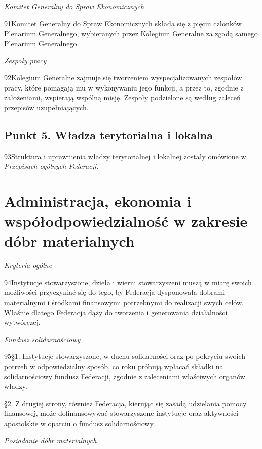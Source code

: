 ﻿\documentclass{book}
\newcommand{\lett}[1]{\lettrine[findent=6pt]{#1}}
\newcommand{\ssec}[1]{\vspace{1em}\textit{#1}\vspace{.5em}\nopagebreak}
\begin{document}
\ssec{Komitet Generalny do Spraw Ekonomicznych}


\lett{91} Komitet Generalny do Spraw Ekonomicznych składa się z pięciu członków Plenarium Generalnego, wybieranych przez Kolegium Generalne za zgodą samego Plenarium Generalnego.
 
\ssec{Zespoły pracy}


\lett{92} Kolegium Generalne zajmuje się tworzeniem wyspecjalizowanych zespołów pracy, które pomagają mu w wykonywaniu jego funkcji, a przez to, zgodnie z założeniami, wspierają wspólną misję. Zespoły podzielone są według zaleceń przepisów uzupełniających.
 


\section{Punkt 5. Władza terytorialna i lokalna}


\lett{93} Struktura i uprawnienia władzy terytorialnej i lokalnej zostały omówione w {\em Przepisach ogólnych Federacji}.
 


\chapter{Administracja, ekonomia i współodpowiedzialność w zakresie dóbr materialnych}


\ssec{Kryteria ogólne}


\lett{94} Instytucje stowarzyszone, dzieła i wierni stowarzyszeni muszą w miarę swoich możliwości przyczyniać się do tego, by Federacja dysponowała dobrami materialnymi i środkami finansowymi potrzebnymi do realizacji swych celów. Właśnie dlatego Federacja dąży do tworzenia i generowania działalności wytwórczej.
 


\ssec{Fundusz solidarnościowy}


\lett{95} \S{}1. Instytucje stowarzyszone, w duchu solidarności oraz po pokryciu swoich potrzeb w odpowiedzialny sposób, co roku próbują wpłacać składki na solidarnościowy fundusz Federacji, zgodnie z zaleceniami właściwych organów władzy.


\S{}2. Z drugiej strony, również Federacja, kierując się zasadą udzielania pomocy finansowej, może dofinansowywać stowarzyszone instytucje oraz aktywności apostolskie w oparciu o fundusz solidarnościowy.


\ssec{Posiadanie dóbr materialnych}
\end{document}
